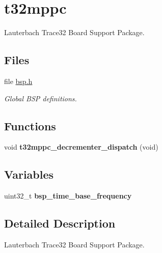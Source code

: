 \hypertarget{group__RTEMSBSPsPowerPCT32MPPC}{}\section{t32mppc}
\label{group__RTEMSBSPsPowerPCT32MPPC}


Lauterbach Trace32 Board Support Package.  


\subsection*{Files}
\begin{DoxyCompactItemize}
\item 
file \mbox{\hyperlink{bsps_2powerpc_2t32mppc_2include_2bsp_8h}{bsp.\+h}}
\begin{DoxyCompactList}\small\item\em Global B\+SP definitions. \end{DoxyCompactList}\end{DoxyCompactItemize}
\subsection*{Functions}
\begin{DoxyCompactItemize}
\item 
\mbox{\label{group__RTEMSBSPsPowerPCT32MPPC_ga8d9e291a8903d70da33b33150d5025e0}} 
void {\bfseries t32mppc\+\_\+decrementer\+\_\+dispatch} (void)
\end{DoxyCompactItemize}
\subsection*{Variables}
\begin{DoxyCompactItemize}
\item 
\mbox{\label{group__RTEMSBSPsPowerPCT32MPPC_ga90264c44b2ad45b187acedda94154541}} 
uint32\+\_\+t {\bfseries bsp\+\_\+time\+\_\+base\+\_\+frequency}
\end{DoxyCompactItemize}


\subsection{Detailed Description}
Lauterbach Trace32 Board Support Package. 

